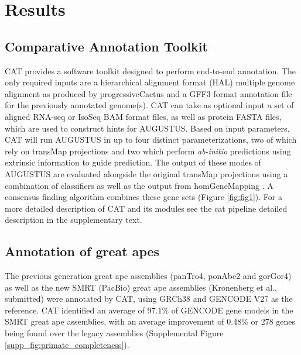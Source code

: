 \documentclass[fleqn,10pt]{wlscirep}
\begin{document}
\section*{Results}
\subsection*{Comparative Annotation Toolkit}
CAT provides a software toolkit designed to perform end-to-end annotation. The only required inputs are a hierarchical alignment format (HAL) \cite{hickey2013hal} multiple genome alignment as produced by progressiveCactus and a GFF3 format annotation file for the previously annotated genome(s). CAT can take as optional input a set of aligned RNA-seq or IsoSeq BAM format files, as well as protein FASTA files, which are used to construct hints for AUGUSTUS. Based on input parameters, CAT will run AUGUSTUS in up to four distinct parameterizations, two of which rely on transMap projections and two which perform \textit{ab-initio} predictions using extrinsic information to guide prediction. The output of these modes of AUGUSTUS are evaluated alongside the original transMap projections using a combination of classifiers as well as the output from homGeneMapping \cite{stanke2004augustus}. A consensus finding algorithm combines these gene sets (Figure \ref{fig:fig1}). For a more detailed description of CAT and its modules see the cat pipeline detailed description in the supplementary text.

\subsection*{Annotation of great apes}
The previous generation great ape assemblies (panTro4, ponAbe2 and gorGor4) as well as the new SMRT (PacBio) great ape assemblies \cite{gordon2016long} (Kronenberg et al., submitted) were annotated by CAT, using GRCh38  and GENCODE V27 as the reference. CAT identified an average of 97.1\% of GENCODE gene models in the SMRT great ape assemblies, with an average improvement of 0.48\% or 278 genes being found over the legacy assemblies  (Supplemental Figure \ref{supp_fig:primate_completeness}).
\end{document}
